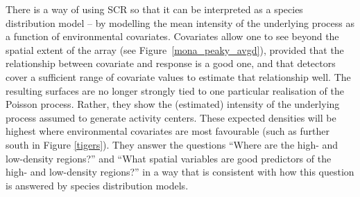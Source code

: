 \documentclass[useAMS,usenatbib,referee]{biom}
\begin{document}

There is a way of using SCR so that it can be interpreted as a species distribution model -- by modelling the mean intensity of the underlying process as a function of environmental covariates. Covariates allow one to see beyond the spatial extent of the array (see Figure~\ref{mona_peaky_avgd}), provided that the relationship between covariate and response is a good one, and that detectors cover a sufficient range of covariate values to estimate that relationship well. The resulting surfaces are no longer strongly tied to one particular realisation of the Poisson process. Rather, they show the (estimated) intensity of the underlying process assumed to generate activity centers. These expected densities will be highest where environmental covariates are most favourable (such as further south in Figure \ref{tigers}). They answer the questions ``Where are the high- and low-density regions?'' and ``What spatial variables are good predictors of the high- and low-density regions?'' in a way that is consistent with how this question is answered by species distribution models. %
\end{document}
